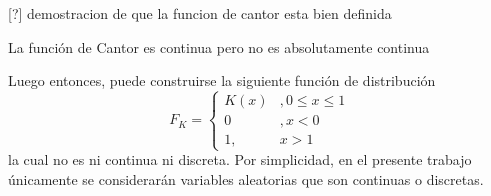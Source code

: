 [?] demostracion de que la funcion de cantor esta bien definida

\begin{proposicion}
La función de Cantor es continua pero no es absolutamente continua
\end{proposicion}

Luego entonces, puede construirse la siguiente función de distribución
\begin{equation}
F_K = \begin{cases}
K(x) &, 0\leq x \leq 1 \\
0 &, x < 0 \\
1 ,& x > 1
\end{cases}
\end{equation}
la cual no es ni continua ni discreta. Por simplicidad, en el presente trabajo únicamente se considerarán variables aleatorias que son continuas o discretas.






